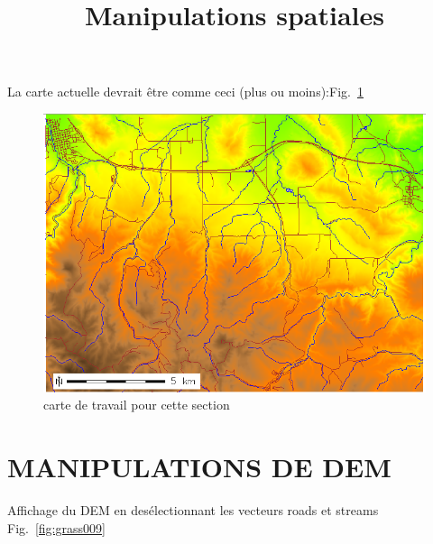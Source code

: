 %

\graphicspath{{./images/}}

\title{Manipulations spatiales}
\subtitle{}
\author{}

\maketitle

La carte actuelle devrait \^etre comme ceci (plus ou moins):Fig.~\ref{fig:grass008}

\begin{figure}[htbp]
   \centering
   \includegraphics[scale=0.35]{grass008.png}
   \caption{carte de travail pour cette section}
   \label{fig:grass008}
\end{figure}

\section{MANIPULATIONS DE DEM}
Affichage du DEM en des\'electionnant les vecteurs roads et streams Fig.~\ref{fig:grass009}

